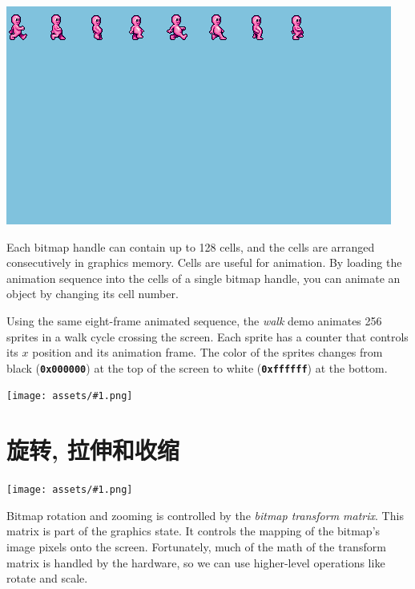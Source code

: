 \documentclass[10pt]{book}
\newcommand{\png}[1]{
\begin{center}
\texttt{[image: assets/\#1.png]}
\end{center}
}
\newcommand{\mach}[1]{\texttt{\textbf{#1}}}
\newcommand{\term}[1]{\emph{#1}\index{#1}}
\begin{document}
\begin{CJK}{UTF8}{gkai}
\noindent
\includegraphics[width=\textwidth,trim=0 216 80 0,clip=true]{assets/0058.png}

Each bitmap handle can contain up to 128 cells, and the cells are arranged
consecutively in graphics memory.
Cells are useful for animation.
By loading the animation sequence into the cells of a single bitmap handle,
you can animate an object by changing its cell number.

Using the same eight-frame animated sequence,
the \textit{walk} demo animates 256 sprites in a walk cycle crossing the screen.
Each sprite has a counter that controls its $x$ position and its animation frame.
The color of the sprites changes from black (\mach{0x000000}) at the top of the screen to white (\mach{0xffffff}) at the bottom.

\newpage
\png{walk}


\newpage
\section{旋转, 拉伸和收缩}
\png{0043}

Bitmap rotation and zooming is controlled by the
\term{bitmap transform matrix}.
This matrix is part of the graphics state.
It controls the mapping of the bitmap's image pixels onto the screen.
Fortunately, much of the math of the transform matrix is handled by the hardware, so
we can use higher-level operations like rotate and scale.


\end{CJK}
\end{document}
